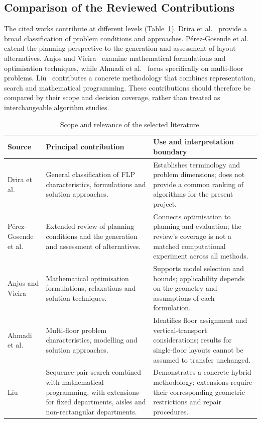 \documentclass[10pt,a4paper]{article}
\begin{document}
\subsection{Comparison of the Reviewed Contributions}

The cited works contribute at different levels (Table~\ref{tab:review-comparison}).
Drira et al.\ \cite{drira2007} provide a broad classification of problem
conditions and approaches. P\'{e}rez-Gosende et al.\ \cite{perez2021}
extend the planning perspective to the generation and assessment of layout
alternatives. Anjos and Vieira\ \cite{anjos2017} examine mathematical
formulations and optimisation techniques, while Ahmadi et al.\ \cite{ahmadi2017}
focus specifically on multi-floor problems. Liu\ \cite{liu2004} contributes a
concrete methodology that combines representation, search and mathematical
programming. These contributions should therefore be compared by their scope
and decision coverage, rather than treated as interchangeable algorithm studies.

\begin{table}[htbp]
\centering
\caption{Scope and relevance of the selected literature.}
\label{tab:review-comparison}
\small
\renewcommand{\arraystretch}{1.16}
\begin{tabularx}{\textwidth}{@{}p{} >{\raggedright\arraybackslash}X >{\raggedright\arraybackslash}X@{}}
\toprule
\textbf{Source} & \textbf{Principal contribution} & \textbf{Use and interpretation boundary} \\
\midrule
Drira et al.\ \cite{drira2007}
& General classification of FLP characteristics, formulations and solution approaches.
& Establishes terminology and problem dimensions; does not provide a common ranking of algorithms for the present project. \\
\addlinespace
P\'{e}rez-Gosende et al.\ \cite{perez2021}
& Extended review of planning conditions and the generation and assessment of alternatives.
& Connects optimisation to planning and evaluation; the review's coverage is not a matched computational experiment across all methods. \\
\addlinespace
Anjos and Vieira\ \cite{anjos2017}
& Mathematical optimisation formulations, relaxations and solution techniques.
& Supports model selection and bounds; applicability depends on the geometry and assumptions of each formulation. \\
\addlinespace
Ahmadi et al.\ \cite{ahmadi2017}
& Multi-floor problem characteristics, modelling and solution approaches.
& Identifies floor assignment and vertical-transport considerations; results for single-floor layouts cannot be assumed to transfer unchanged. \\
\addlinespace
Liu\ \cite{liu2004}
& Sequence-pair search combined with mathematical programming, with extensions for fixed departments, aisles and non-rectangular departments.
& Demonstrates a concrete hybrid methodology; extensions require their corresponding geometric restrictions and repair procedures. \\
\bottomrule
\end{tabularx}
\end{table}
\end{document}
